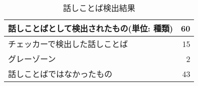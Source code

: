 \begin{table}[H]
\centering
\caption{話しことば検出結果}
\label{result-expert}
\begin{tabular}{|l|r|}
\hline
話しことばとして検出されたもの(単位: 種類) & 60 \\ \hline
チェッカーで検出した話しことば & 15 \\ \hline
グレーゾーン & 2 \\ \hline
話しことばではなかったもの & 43 \\ \hline
\end{tabular}
\end{table} %